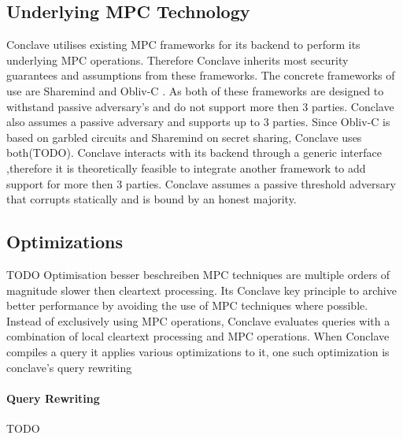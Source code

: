 \subsection{Underlying MPC Technology}
Conclave utilises existing MPC frameworks for its backend to perform its underlying MPC operations. Therefore Conclave inherits most security guarantees and assumptions from these frameworks. The concrete frameworks of use are Sharemind \cite{bogdanov2008sharemind} and Obliv-C \cite{zahur2015obliv}. As both of these frameworks are designed to withstand passive adversary's and do not support more then 3 parties. Conclave also assumes a passive adversary and supports up to 3 parties.
Since Obliv-C is based on garbled circuits and Sharemind on secret sharing, Conclave uses both(TODO). Conclave interacts with its backend through a generic interface ,therefore it is theoretically feasible to integrate another framework to add support for more then 3 parties. Conclave assumes a passive threshold adversary that corrupts statically and is bound by an honest majority.




\subsection{Optimizations} TODO Optimisation besser beschreiben 
MPC techniques are multiple orders of magnitude slower then cleartext processing. Its Conclave key principle to archive better performance by avoiding the use of MPC techniques where possible. Instead of exclusively using MPC operations, Conclave evaluates queries with a combination of local cleartext processing and MPC operations. When Conclave compiles a query it applies various optimizations to it, one such optimization is conclave's query rewriting 
\paragraph{Query Rewriting} TODO

